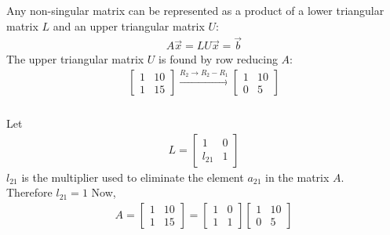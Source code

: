 \documentclass{beamer}
\begin{document}
\begin{frame}
\frametitle{}
Any non-singular matrix can be represented as a product of a lower triangular matrix \( L \) and an upper triangular matrix \( U \):
\begin{align}
    A\vec{x} = LU\vec{x} = \vec{b}
\end{align}
The upper triangular matrix \( U \) is found by row reducing \( A \):
\begin{align}
    \begin{bmatrix}1 & 10\\1 & 15\end{bmatrix} \xrightarrow{R_2 \to R_2 - R_1} \begin{bmatrix}1 & 10\\0 & 5\end{bmatrix}
\end{align}
\end{frame}
\begin{frame}
\frametitle{}    
Let 
\begin{align}
    L = \begin{bmatrix}1 & 0\\l_{21} & 1\end{bmatrix}
\end{align}
\( l_{21} \) is the multiplier used to eliminate the element \( a_{21} \) in the matrix \( A \). \\
Therefore $l_{21} = 1$
\newline
Now,
\begin{align}
   A=\begin{bmatrix}1 & 10\\1 & 15\end{bmatrix} = \begin{bmatrix}1 & 0\\1 & 1\end{bmatrix}\begin{bmatrix}1 & 10\\0 & 5\end{bmatrix}
\end{align}
\end{frame}
\end{document}
